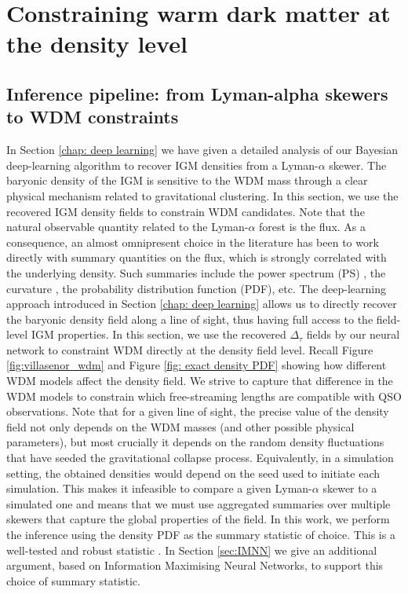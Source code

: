 \chapter{Constraining warm dark matter at the density level}\label{sec: inference pipeline}


\section{Inference pipeline: from Lyman-alpha skewers to WDM constraints}\label{sec: inference algo}

In Section \ref{chap: deep learning} we have given a detailed analysis of our Bayesian deep-learning algorithm to recover IGM densities from a Lyman-$\alpha$ skewer. The baryonic density of the IGM is sensitive to the WDM mass through a clear physical mechanism related to gravitational clustering. In this section, we use the recovered IGM density fields to constrain WDM candidates. Note that the natural observable quantity related to the Lyman-$\alpha$ forest is the flux. As a consequence, an almost omnipresent choice in the literature has been to work directly with summary quantities on the flux, which is strongly correlated with the underlying density. Such summaries include the power spectrum (PS) \cite{Villasenor_2023}, the curvature \cite{Becker_2010}, the probability distribution function (PDF), etc. The deep-learning approach introduced in Section \ref{chap: deep learning} allows us to directly recover the baryonic density field along a line of sight, thus having full access to the field-level IGM properties. In this section, we use the recovered $\Delta_\tau$ fields by our neural network to constraint WDM directly at the density field level. Recall Figure \ref{fig:villasenor_wdm} and Figure \ref{fig: exact density PDF} showing how different WDM models affect the density field. We strive to capture that difference in the WDM models to constrain which free-streaming lengths are compatible with QSO observations. Note that for a given line of sight, the precise value of the density field not only depends on the WDM masses (and other possible physical parameters), but most crucially it depends on the random density fluctuations that have seeded the gravitational collapse process. Equivalently, in a simulation setting, the obtained densities would depend on the seed used to initiate each simulation. This makes it infeasible to compare a given Lyman-$\alpha$ skewer to a simulated one and means that we must use aggregated summaries over multiple skewers that capture the global properties of the field. In this work, we perform the inference using the density PDF as the summary statistic of choice. This is a well-tested and robust statistic \cite{Gaikwad_2021}. In Section \ref{sec:IMNN} we give an additional argument, based on Information Maximising Neural Networks, to support this choice of summary statistic.


